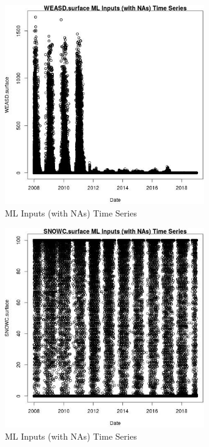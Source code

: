 \begin{figure} 
\centering  
\includegraphics[width=0.77\textwidth]{Code_Outputs/Report_ML_input_PM25_Step4_part_f_de_duplicated_aveswNAs_WEASDsurfacevDate.jpg} 
\caption{\label{fig:Report_ML_input_PM25_Step4_part_f_de_duplicated_aveswNAsWEASDsurfacevDate}ML Inputs (with NAs) Time Series} 
\end{figure} 
 

\begin{figure} 
\centering  
\includegraphics[width=0.77\textwidth]{Code_Outputs/Report_ML_input_PM25_Step4_part_f_de_duplicated_aveswNAs_SNOWCsurfacevDate.jpg} 
\caption{\label{fig:Report_ML_input_PM25_Step4_part_f_de_duplicated_aveswNAsSNOWCsurfacevDate}ML Inputs (with NAs) Time Series} 
\end{figure} 
 

